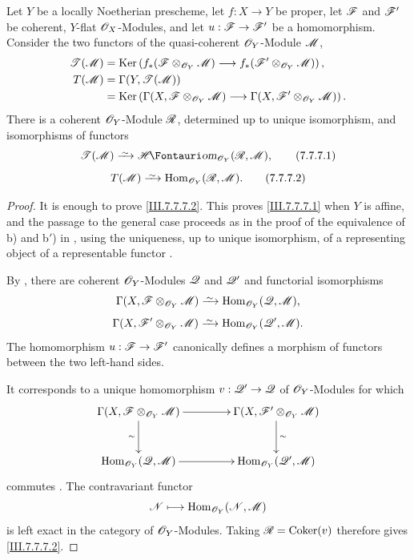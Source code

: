 \begin{corollary}[7.7.7]
\label{III.7.7.7}
Let $Y$ be a locally Noetherian prescheme, let
$f:X\to Y$ be proper, let $\mathscr{F}$ and $\mathscr{F}'$ be
coherent, $Y$-flat $\mathscr{O}_X$-Modules, and let
$u:\mathscr{F}\to\mathscr{F}'$ be a homomorphism.  Consider the two
functors of the quasi-coherent $\mathscr{O}_Y$-Module $\mathscr{M}$,
\begin{align*}
  \mathscr{T}(\mathscr{M})
  &=
  \operatorname{Ker}\left(
    f_*(\mathscr{F}\otimes_{\mathscr{O}_Y}\mathscr{M})
    \longrightarrow
    f_*(\mathscr{F}'\otimes_{\mathscr{O}_Y}\mathscr{M})
  \right),\\
  T(\mathscr{M})
  &=
  \Gamma(Y,\mathscr{T}(\mathscr{M}))\\
  &=
  \operatorname{Ker}\left(
    \Gamma(X,\mathscr{F}\otimes_{\mathscr{O}_Y}\mathscr{M})
    \longrightarrow
    \Gamma(X,\mathscr{F}'\otimes_{\mathscr{O}_Y}\mathscr{M})
  \right).
\end{align*}
There is a coherent $\mathscr{O}_Y$-Module $\mathscr{R}$, determined
up to unique isomorphism, and isomorphisms of functors
\[
  \sh{T}(\sh{M})
  \simto
  \shHom_{\sh{O}_Y}(\sh{R},\sh{M}),
  \tag{7.7.7.1}\label{III.7.7.7.1}
\]
\[
  T(\sh{M})
  \simto
  \Hom_{\sh{O}_Y}(\sh{R},\sh{M}).
  \tag{7.7.7.2}\label{III.7.7.7.2}
\]
\end{corollary}

\begin{proof}
It is enough to prove \eqref{III.7.7.7.2}.  This proves
\eqref{III.7.7.7.1} when $Y$ is affine, and the passage to
the general case proceeds as in the proof of the equivalence
of b) and b$'$) in , using the uniqueness,
up to unique isomorphism, of a representing object of a
representable functor .

By , there are coherent
$\mathscr{O}_Y$-Modules $\mathscr{Q}$ and $\mathscr{Q}'$ and functorial
isomorphisms
\[
  \Gamma(X,\sh{F}\otimes_{\sh{O}_Y}\sh{M})
  \simto
  \Hom_{\sh{O}_Y}(\sh{Q},\sh{M}),
\]
\[
  \Gamma(X,\sh{F}'\otimes_{\sh{O}_Y}\sh{M})
  \simto
  \Hom_{\sh{O}_Y}(\sh{Q}',\sh{M}).
\]
The homomorphism $u:\mathscr{F}\to\mathscr{F}'$ canonically defines a
morphism of functors between the two left-hand sides.

It corresponds to a unique homomorphism
$v:\mathscr{Q}'\to\mathscr{Q}$ of $\mathscr{O}_Y$-Modules for which
\[
\xymatrix@C=42pt@R=28pt{
  \Gamma(X,\sh{F}\otimes_{\sh{O}_Y}\sh{M})
    \ar[r]\ar[d]_-{\sim}
  &
  \Gamma(X,\sh{F}'\otimes_{\sh{O}_Y}\sh{M})
    \ar[d]^-{\sim}
  \\
  \Hom_{\sh{O}_Y}(\sh{Q},\sh{M})
    \ar[r]
  &
  \Hom_{\sh{O}_Y}(\sh{Q}',\sh{M})
}
\]
commutes .  The contravariant functor
\[
  \mathscr{N}\longmapsto
  \operatorname{Hom}_{\mathscr{O}_Y}(\mathscr{N},\mathscr{M})
\]
is left exact in the category of $\mathscr{O}_Y$-Modules.
Taking $\mathscr{R}=\operatorname{Coker}(v)$ therefore gives
\eqref{III.7.7.7.2}.
\end{proof}

